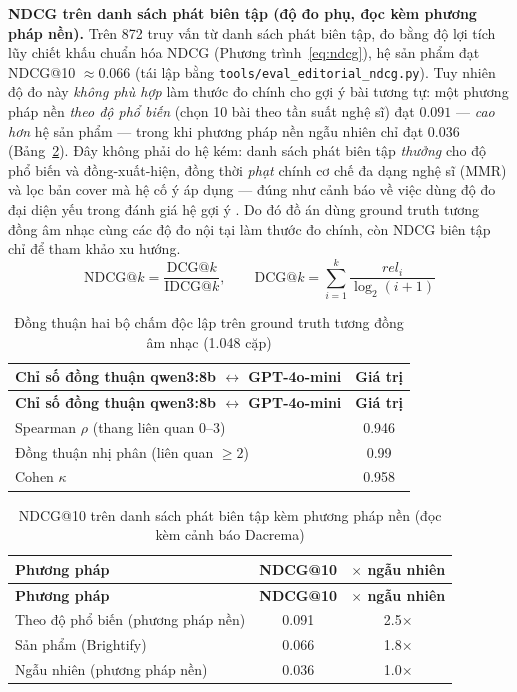 \documentclass[../DoAn.tex]{subfiles}
\begin{document}
\textbf{NDCG trên danh sách phát biên tập (độ đo phụ, đọc kèm phương pháp nền).} Trên 872 truy vấn từ danh sách phát biên tập, đo bằng độ lợi tích lũy chiết khấu chuẩn hóa NDCG \cite{jarvelin2002ndcg} (Phương trình~\eqref{eq:ndcg}), hệ sản phẩm đạt NDCG@10 $\approx 0.066$ (tái lập bằng \texttt{tools/eval\_editorial\_ndcg.py}). Tuy nhiên độ đo này \textit{không phù hợp} làm thước đo chính cho gợi ý bài tương tự: một phương pháp nền \textit{theo độ phổ biến} (chọn 10 bài theo tần suất nghệ sĩ) đạt $0.091$ --- \textit{cao hơn} hệ sản phẩm --- trong khi phương pháp nền ngẫu nhiên chỉ đạt $0.036$ (Bảng~\ref{table:editorial}). Đây không phải do hệ kém: danh sách phát biên tập \textit{thưởng} cho độ phổ biến và đồng-xuất-hiện, đồng thời \textit{phạt} chính cơ chế đa dạng nghệ sĩ (MMR) và lọc bản cover mà hệ cố ý áp dụng --- đúng như cảnh báo về việc dùng độ đo đại diện yếu trong đánh giá hệ gợi ý \cite{dacrema2019progress}. Do đó đồ án dùng ground truth tương đồng âm nhạc cùng các độ đo nội tại làm thước đo chính, còn NDCG biên tập chỉ để tham khảo xu hướng.
\begin{equation}\label{eq:ndcg}
    \text{NDCG@}k = \frac{\text{DCG@}k}{\text{IDCG@}k}, \qquad
    \text{DCG@}k = \sum_{i=1}^{k} \frac{rel_i}{\log_2(i+1)}
\end{equation}

\begin{longtable}{|p{8.0cm}|c|}
\caption{Đồng thuận hai bộ chấm độc lập trên ground truth tương đồng âm nhạc (1.048 cặp)}\label{table:multijudge}\\
\hline
\textbf{Chỉ số đồng thuận qwen3:8b $\leftrightarrow$ GPT-4o-mini} & \textbf{Giá trị} \\
\hline
\endfirsthead
\hline
\textbf{Chỉ số đồng thuận qwen3:8b $\leftrightarrow$ GPT-4o-mini} & \textbf{Giá trị} \\
\hline
\endhead
Spearman $\rho$ (thang liên quan $0$--$3$) & 0.946 \\
\hline
Đồng thuận nhị phân (liên quan $\geq 2$) & 0.99 \\
\hline
Cohen $\kappa$ & 0.958 \\
\hline
\end{longtable}

\begin{longtable}{|p{6.0cm}|c|c|}
\caption{NDCG@10 trên danh sách phát biên tập kèm phương pháp nền (đọc kèm cảnh báo Dacrema)}\label{table:editorial}\\
\hline
\textbf{Phương pháp} & \textbf{NDCG@10} & \textbf{$\times$ ngẫu nhiên} \\
\hline
\endfirsthead
\hline
\textbf{Phương pháp} & \textbf{NDCG@10} & \textbf{$\times$ ngẫu nhiên} \\
\hline
\endhead
Theo độ phổ biến (phương pháp nền) & 0.091 & 2.5$\times$ \\
\hline
Sản phẩm (Brightify) & 0.066 & 1.8$\times$ \\
\hline
Ngẫu nhiên (phương pháp nền) & 0.036 & 1.0$\times$ \\
\hline
\end{longtable}
\end{document}

